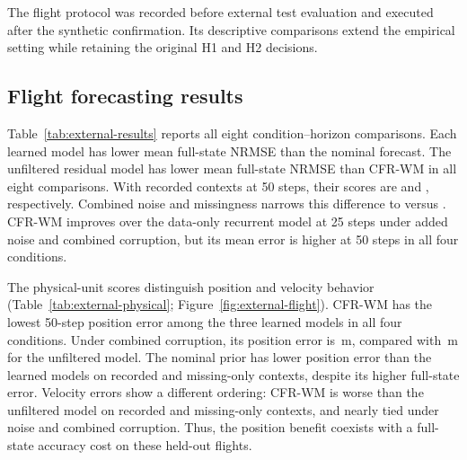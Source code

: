 The flight protocol was recorded before external test evaluation and executed
after the synthetic confirmation. Its descriptive comparisons extend the
empirical setting while retaining the original H1 and H2 decisions.

\subsection{Flight forecasting results}

Table~\ref{tab:external-results} reports all eight condition--horizon
comparisons. Each learned model has lower mean full-state NRMSE than the
nominal forecast. The unfiltered residual model has lower mean full-state
NRMSE than CFR-WM in all eight comparisons. With recorded contexts at 50 steps,
their scores are \ExternalUnfilteredRecordedLongNRMSEMean{} and
\ExternalCFRRecordedLongNRMSEMean{}, respectively. Combined noise and
missingness narrows this difference to
\ExternalUnfilteredCombinedLongNRMSEMean{} versus
\ExternalCFRCombinedLongNRMSEMean{}.
CFR-WM improves over the data-only recurrent model at 25 steps under added
noise and combined corruption, but its mean error is higher at 50 steps
in all four conditions.

The physical-unit scores distinguish position and velocity behavior
(Table~\ref{tab:external-physical}; Figure~\ref{fig:external-flight}).
CFR-WM has the lowest 50-step position error among the three learned models
in all four conditions. Under combined corruption, its position error is
\ExternalCFRCombinedLongPositionMean{}\,m, compared with
\ExternalUnfilteredCombinedLongPositionMean{}\,m for the unfiltered model.
The nominal prior has lower position error than the learned models on
recorded and missing-only contexts, despite its higher full-state error.
Velocity errors show a different ordering: CFR-WM is worse than the
unfiltered model on recorded and missing-only contexts, and nearly tied
under noise and combined corruption. Thus, the position benefit coexists
with a full-state accuracy cost on these held-out flights.

\begin{table}[t]
\centering
\caption{External flight NRMSE (Equation~\ref{eq:external-score}). Entries
are means $\pm$ SD across five training seeds after equal weighting of three
held-out flights. The nominal forecast is deterministic. All four context
conditions and both horizons are retained.}
\label{tab:external-results}
\resizebox{\textwidth}{!}{}
\end{table}

